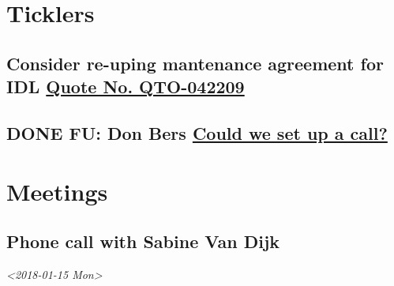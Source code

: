 \documentclass[11pt]{article}
\author{Tom Shannon}
\date{\today}
\title{}
\begin{document}
\tableofcontents

\section{\textbf{Ticklers}}
\label{sec:orga504bbf}
\subsection{Consider re-uping mantenance agreement for IDL \href{//\%3c0625ed0fbf874548891800b852e2a7f5@MLBXCH15.cs.myharris.net\%3E}{Quote No. QTO-042209}}
\label{sec:orgaf9b9aa}

\subsection{{\bfseries\sffamily DONE} FU: Don Bers \href{//\%3cF72116E9-F896-444D-A834-02403F73F1FD@rush.edu\%3E}{Could we set up a call?}}
\label{sec:org11734d7}
\section{\textbf{Meetings}}
\label{sec:org5775d57}
\subsection{Phone call with Sabine Van Dijk}
\label{sec:org4d82561}
\textit{<2018-01-15 Mon>}
\end{document}
